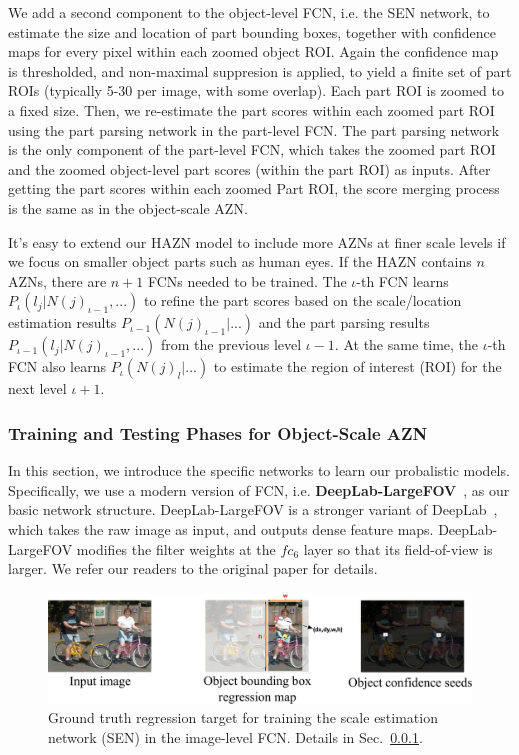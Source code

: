 We add a second component to the object-level FCN, i.e. the SEN network, to estimate the size and location of part bounding boxes,
together with confidence maps for every pixel within each zoomed object ROI. Again the confidence map is thresholded, and non-maximal suppresion is applied,
to yield a finite set of part ROIs (typically 5-30 per image, with some overlap). Each part ROI is zoomed to a fixed size.
Then, we re-estimate the part scores within each zoomed part ROI using the part parsing network in the part-level FCN.
The part parsing network is the only component of the part-level FCN, which takes the zoomed part ROI and the zoomed object-level part scores (within the part ROI) as inputs.
After getting the part scores within each zoomed Part ROI, the score merging process is the same as in the object-scale AZN.

It's easy to extend our HAZN model to include more AZNs at finer scale levels if we focus on smaller object parts such as human eyes.
If the HAZN contains $n$ AZNs, there are $n+1$ FCNs needed to be trained.
The $\iota$-th FCN learns $P_\iota(l_j | N(j)_{\iota-1}, ...)$ to refine the part scores based on the scale/location estimation results $P_{\iota-1}(N(j)_{\iota-1} | ...)$
and the part parsing results $P_{\iota-1}(l_j | N(j)_{\iota-1}, ...)$ from the previous level $\iota-1$.
At the same time, the $\iota$-th FCN also learns $P_\iota(N(j)_l | ...)$ to estimate the region of interest (ROI) for the next level $\iota+1$.

\subsubsection{Training and Testing Phases for Object-Scale AZN} 
\label{subsubsec:train_test}
In this section, we introduce the specific networks to learn our probalistic models. Specifically, we use a modern version of FCN, i.e. \textbf{DeepLab-LargeFOV}~\cite{chen2016deeplab}, as our basic network structure. DeepLab-LargeFOV is a stronger variant of DeepLab~\cite{chen2016deeplab}, which takes the raw image as input, and outputs dense feature maps. DeepLab-LargeFOV modifies the filter weights at the $fc_6$ layer so that its field-of-view is larger. We refer our readers to the original paper for details.

\begin{figure}
\begin{center}
   \includegraphics[width=0.8\linewidth]{figs/model_eccv.pdf}
\end{center}
\caption{Ground truth regression target for training the scale estimation network (SEN) in the image-level FCN. Details in Sec.~\ref{subsubsec:train_test}.}
\label{fig:train_sen}
\end{figure}

